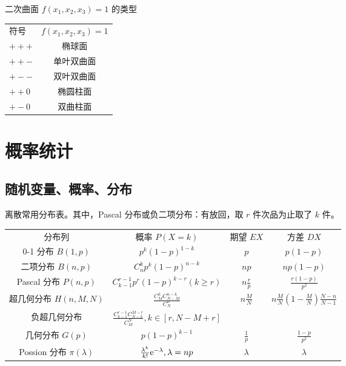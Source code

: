 \documentclass{ctexbook}
\def\e{\textnormal{e}}
\begin{document}
\begin{proposition}[二次曲面的类型]
    二次曲面 $f(x_1,x_2,x_3)=1$ 的类型
    
    \begin{tabular}{lc}
        符号 & $f(x_1,x_2,x_3)=1$ \\
        $+++$ & 椭球面 \\
        $++-$ & 单叶双曲面 \\
        $+--$ & 双叶双曲面 \\
        $++0$ & 椭圆柱面 \\
        $+-0$ & 双曲柱面
    \end{tabular}
\end{proposition}

\part{概率统计}

\chapter{随机变量、概率、分布}

\begin{proposition}[离散常用分布]
    离散常用分布表。其中，Pascal 分布或负二项分布：有放回，取 $r$ 件次品为止取了 $k$ 件。

    \noindent\begin{tabular}{cccc}
        分布列 & 概率 $P(X=k)$ & 期望 $EX$ & 方差 $DX$ \\
        0-1 分布 $B(1,p)$ & $p^k(1-p)^{1-k}$ & $p$ & $p(1-p)$ \\
        二项分布 $B(n,p)$ & $C_n^kp^k(1-p)^{n-k}$ & $np$ & $np(1-p)$ \\
        Pascal 分布 $P(n,p)$ & $C_{k-1}^{r-1}p^r(1-p)^{k-r} (k\geq r)$ & $n\frac{r}{p}$ & $\frac{r(1-p)}{p^2}$\\
        超几何分布 $H(n,M,N)$ & $\frac{C_M^kC_{N-M}^{n-k}}{C_N^n}$ & $n\frac{M}{N}$ & $n\frac{M}{N}\left(1-\frac{M}{N}\right)\frac{N-n}{N-1}$ \\
        负超几何分布 & $\frac{C_{k-1}^{r-1}C_{N-k}^{M-r}}{C_M^N}, k\in [r,N-M+r]$ & & \\
        几何分布 $G(p)$ & $p(1-p)^{k-1}$ & $\frac{1}{p}$ & $\frac{1-p}{p^2}$ \\
        Possion 分布 $\pi(\lambda)$ & $\frac{\lambda^k}{k!}\e^{-\lambda}, \lambda=np$ & $\lambda$ & $\lambda$
    \end{tabular}
\end{proposition}
\end{document}
